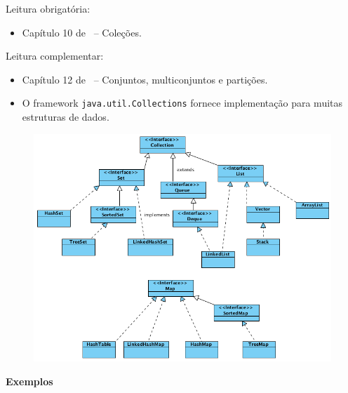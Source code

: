 \newcommand{\templatesdir}{../../../templates}
\newcommand{\template}{template-roteiro-est}


\newcommand{\content}{Outras estruturas de dados lineares}
\newcommand{\class}{Algoritmos e Estruturas de Dados}
\newcommand{\shortcourse}{45EST}



\makeheader

Leitura obrigatória:
\begin{itemize}
	\item Capítulo 10 de~\cite{DeitelAndDeitel2010} -- Coleções.
\end{itemize}

Leitura complementar:
\begin{itemize}
	\item Capítulo 12 de~\cite{Preiss2001} -- Conjuntos, multiconjuntos e partições.
\end{itemize}

\medskip


\begin{itemize}
	\item O framework \texttt{java.util.Collections} fornece implementação para muitas estruturas de dados.
\end{itemize}

\begin{figure}[H]
	\centering
	\includegraphics[width=0.74\linewidth]{img/collections}
\end{figure}

\clearpage

\textbf{Exemplos}

